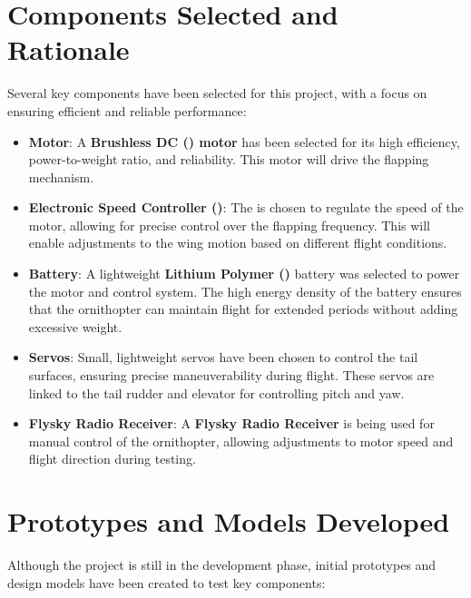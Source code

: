 \section{Components Selected and Rationale}
Several key components have been selected for this project, with a focus on ensuring efficient and reliable performance:

\begin{itemize}
    \item \textbf{\bldc Motor}: A \textbf{Brushless DC (\bldc) motor} has been selected for its high efficiency, power-to-weight ratio, and reliability. This motor will drive the flapping mechanism.
    
    \item \textbf{Electronic Speed Controller (\esc)}: The \textbf{\esc} is chosen to regulate the speed of the motor, allowing for precise control over the flapping frequency. This will enable adjustments to the wing motion based on different flight conditions.
    
    \item \textbf{\lipo Battery}: A lightweight \textbf{Lithium Polymer (\lipo)} battery was selected to power the motor and control system. The high energy density of the \lipo battery ensures that the ornithopter can maintain flight for extended periods without adding excessive weight.
    
    \item \textbf{Servos}: Small, lightweight servos have been chosen to control the tail surfaces, ensuring precise maneuverability during flight. These servos are linked to the tail rudder and elevator for controlling pitch and yaw.
    
    \item \textbf{Flysky Radio Receiver}: A \textbf{Flysky Radio Receiver} is being used for manual control of the ornithopter, allowing adjustments to motor speed and flight direction during testing.
\end{itemize}

\section{Prototypes and Models Developed}
Although the project is still in the development phase, initial prototypes and design models have been created to test key components:


